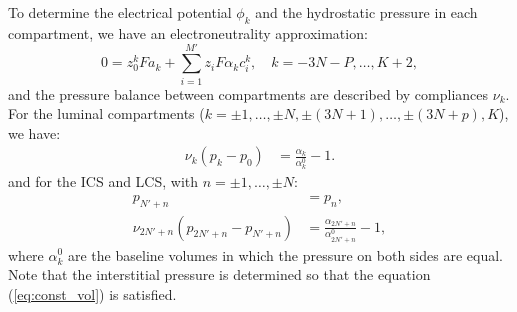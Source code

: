 \documentclass{article}
\begin{document}
To determine the electrical potential $\phi_k$ and the hydrostatic pressure in each compartment, we have an electroneutrality approximation:
\begin{equation}
    0=z_0^k Fa_k+\sum_{i=1}^{M'}z_iF \alpha_k c_i^k,\quad k=-3N-P,\dots,K+2,
\end{equation}
and the pressure balance between compartments are described by compliances $\nu_k$.
For the luminal compartments ($k=\pm 1,\dots,\pm N,\pm (3N+1),\dots,\pm(3N+p), K$), we have:
\begin{align}
    \nu_k(p_k - p_0) &= \frac{\alpha_k}{\alpha_k^0}-1.
\end{align}
and for the ICS and LCS, with $n=\pm 1,\dots,\pm N$:
\begin{align}
    p_{N'+n} &= p_n,\\
    \nu_{2N'+n}(p_{2N'+n} - p_{N'+n}) &= \frac{\alpha_{2N'+n}}{\alpha_{2N'+n}^0}-1,
\end{align}
where $\alpha_k^0$ are the baseline volumes in which the pressure on both sides are equal.
Note that the interstitial pressure is determined so that the equation (\ref{eq:const_vol}) is satisfied.
\end{document}

